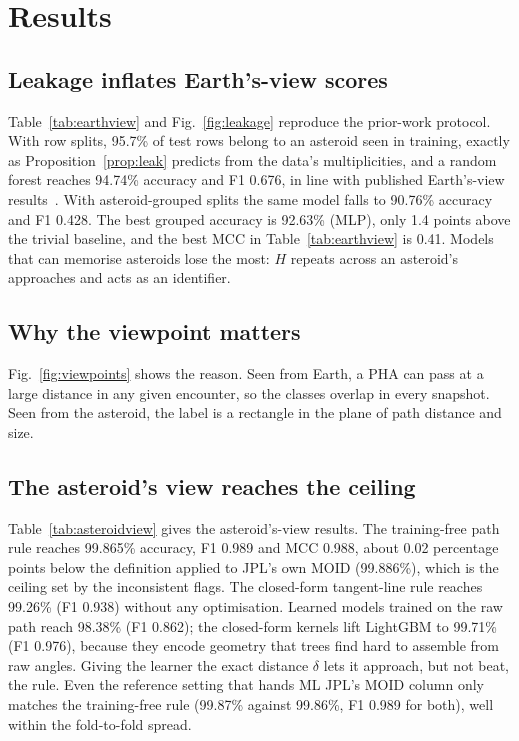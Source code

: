 \documentclass[conference]{IEEEtran}
\begin{document}


\section{Results}




\subsection{Leakage inflates Earth's-view scores}
Table~\ref{tab:earthview} and Fig.~\ref{fig:leakage} reproduce the prior-work protocol. With row splits, 95.7\% of test rows belong to an asteroid seen in training, exactly as Proposition~\ref{prop:leak} predicts from the data's multiplicities, and a random forest reaches 94.74\% accuracy and F1 0.676, in line with published Earth's-view results~\cite{mclemore2022,malakouti2023}. With asteroid-grouped splits the same model falls to 90.76\% accuracy and F1 0.428. The best grouped accuracy is 92.63\% (MLP), only 1.4 points above the trivial baseline, and the best MCC in Table~\ref{tab:earthview} is 0.41. Models that can memorise asteroids lose the most: $H$ repeats across an asteroid's approaches and acts as an identifier.

\subsection{Why the viewpoint matters}
Fig.~\ref{fig:viewpoints} shows the reason. Seen from Earth, a PHA can pass at a large distance in any given encounter, so the classes overlap in every snapshot. Seen from the asteroid, the label is a rectangle in the plane of path distance and size.

\subsection{The asteroid's view reaches the ceiling}
Table~\ref{tab:asteroidview} gives the asteroid's-view results. The training-free path rule reaches 99.865\% accuracy, F1 0.989 and MCC 0.988, about 0.02 percentage points below the definition applied to JPL's own MOID (99.886\%), which is the ceiling set by the inconsistent flags. The closed-form tangent-line rule reaches 99.26\% (F1 0.938) without any optimisation. Learned models trained on the raw path reach 98.38\% (F1 0.862); the closed-form kernels lift LightGBM to 99.71\% (F1 0.976), because they encode geometry that trees find hard to assemble from raw angles. Giving the learner the exact distance $\delta$ lets it approach, but not beat, the rule. Even the reference setting that hands ML JPL's MOID column only matches the training-free rule (99.87\% against 99.86\%, F1 0.989 for both), well within the fold-to-fold spread.
\end{document}
